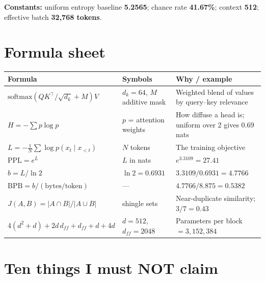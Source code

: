 \documentclass[11pt]{report}
\begin{document}
\textbf{Constants:} uniform entropy baseline \textbf{5.2565}; chance rate
\textbf{41.67\%}; context \textbf{512}; effective batch \textbf{32,768 tokens}.

\section{Formula sheet}

\begin{center}\small
\begin{tabular}{@{}p{4.9cm}p{4.3cm}p{5.1cm}@{}}
\toprule
\textbf{Formula} & \textbf{Symbols} & \textbf{Why / example} \\
\midrule
$\mathrm{softmax}(QK^{\top}/\sqrt{d_k} + M)V$ & $d_k=64$, $M$ additive mask & Weighted blend of values by query--key relevance \\
$H = -\sum p \log p$ & $p$ = attention weights & How diffuse a head is; uniform over 2 gives 0.69 nats \\
$L = -\frac{1}{N}\sum \log p(x_t \mid x_{<t})$ & $N$ tokens & The training objective \\
$\mathrm{PPL} = e^{L}$ & $L$ in nats & $e^{3.3109} = 27.41$ \\
$b = L / \ln 2$ & $\ln 2 = 0.6931$ & $3.3109/0.6931 = 4.7766$ \\
$\mathrm{BPB} = b / (\text{bytes/token})$ & --- & $4.7766/8.875 = 0.5382$ \\
$J(A,B) = |A \cap B| / |A \cup B|$ & shingle sets & Near-duplicate similarity; $3/7 = 0.43$ \\
$4(d^2{+}d) + 2d\,d_{ff} + d_{ff} + d + 4d$ & $d{=}512$, $d_{ff}{=}2048$ & Parameters per block $= 3{,}152{,}384$ \\
\bottomrule
\end{tabular}
\end{center}

\section{Ten things I must NOT claim}
\end{document}
